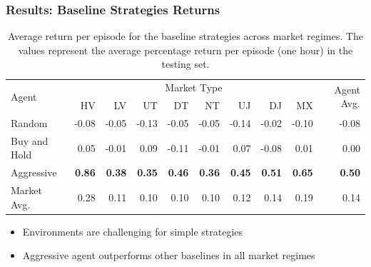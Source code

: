 \documentclass{beamer}
\begin{document}
\begin{frame}
  \frametitle{Results: Baseline Strategies Returns}

  \begin{table}[htbp]
    \fontsize{7}{9}\selectfont
    \centering
    \caption{Average return per episode for the baseline strategies across market regimes. The values represent the average percentage return per episode (one hour) in the testing set.}
    \begin{tabular}{l|rrrrrrrr|r}
    \hline
    \multirow{2}{*}{Agent} & \multicolumn{8}{c|}{Market Type} & \multirow{2}{*}{Agent Avg.} \\
    \cline{2-9}
    & HV &  LV &  UT &  DT &  NT &  UJ &  DJ & MX \\
    \hline
    Random       &     -0.08 &    -0.05 &     -0.13 &       -0.05 &     -0.05 &    -0.14 &      -0.02 &  -0.10 &       -0.08 \\
    Buy and Hold &      0.05 &    -0.01 &      0.09 &       -0.11 &     -0.01 &     0.07 &      -0.08 &   0.01 &        0.00 \\
    Aggressive   &      \textbf{0.86} &     \textbf{0.38} &      \textbf{0.35} &        \textbf{0.46} &      \textbf{0.36} &     \textbf{0.45} &       \textbf{0.51} &   \textbf{0.65} &        \textbf{0.50} \\
    \hline
    Market Avg.  &      0.28 &     0.11 &      0.10 &        0.10 &      0.10 &     0.12 &       0.14 &   0.19 &        0.14 \\
    \end{tabular}
  \end{table}
  
  \begin{itemize}
    \item Environments are challenging for simple strategies
    \item Aggressive agent outperforms other baselines in all market regimes
  \end{itemize}
  
\end{frame}
\end{document}
